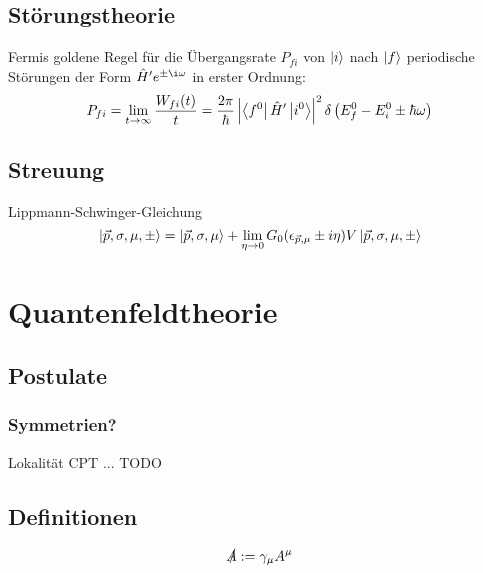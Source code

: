 \documentclass[11pt]{article}
\numberwithin{equation}{section}
\begin{document}
    \subsection{Störungstheorie}
      Fermis goldene Regel für die Übergangsrate $P_{fi}$ von $\Ket{i}$ nach $\Ket{f}$ periodische Störungen der Form $\hat{H}' e^{\pm\i\omega}$ in erster Ordnung:
      \begin{equation}
        P_{fi} = \lim_{t\rightarrow\infty} \frac{W_{fi}(t)}{t} = \frac{2\pi}{\hbar} \left| \Bra{f^0}\hat{H}'\Ket{i^0} \right|^2 \delta\left( E_f^0 - E_i^0 \pm \hbar\omega \right)
      \end{equation}


    \subsection{Streuung}
      Lippmann-Schwinger-Gleichung
      \begin{equation}
        \Ket{\vec{p},\sigma,\mu,\pm} = \Ket{\vec{p}, \sigma, \mu} + \lim_{\eta\rightarrow 0} G_0(\epsilon_{\vec{p},\mu}\pm i\eta) V \Ket{\vec{p},\sigma,\mu,\pm}
      \end{equation}


  \newpage
	\section{Quantenfeldtheorie} %
    \subsection{Postulate}
      \subsubsection{Symmetrien?}
        Lokalität
        CPT
        ...
        TODO
    \subsection{Definitionen}
      \begin{equation}
        \slashed{A} := \gamma_\mu A^\mu
      \end{equation}
\end{document}

